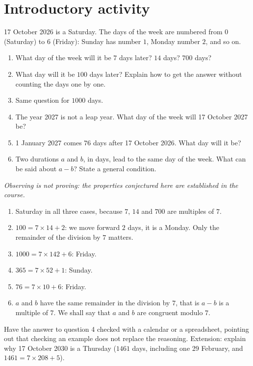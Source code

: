 \section{Introductory activity}
\begin{activity}
17 October 2026 is a Saturday. The days of the week are numbered from $0$ (Saturday) to $6$ (Friday): Sunday has number $1$, Monday number $2$, and so on.
\begin{enumerate}
\item What day of the week will it be $7$ days later? $14$ days? $700$ days?
\item What day will it be $100$ days later? Explain how to get the answer without counting the days one by one.
\item Same question for $\num{1000}$ days.
\item The year 2027 is not a leap year. What day of the week will 17 October 2027 be?
\item 1 January 2027 comes $76$ days after 17 October 2026. What day will it be?
\item Two durations $a$ and $b$, in days, lead to the same day of the week. What can be said about $a-b$? State a general condition.
\end{enumerate}
\par\emph{Observing is not proving: the properties conjectured here are established in the course.}
\end{activity}
\begin{solution}[Activity]
\begin{enumerate}
\item Saturday in all three cases, because $7$, $14$ and $700$ are multiples of $7$.
\item $100=7\times14+2$: we move forward $2$ days, it is a Monday. Only the remainder of the division by $7$ matters.
\item $\num{1000}=7\times142+6$: Friday.
\item $365=7\times52+1$: Sunday.
\item $76=7\times10+6$: Friday.
\item $a$ and $b$ have the same remainder in the division by $7$, that is $a-b$ is a multiple of $7$. We shall say that $a$ and $b$ are congruent modulo $7$.
\end{enumerate}
\end{solution}
\begin{teachernote}
Have the answer to question 4 checked with a calendar or a spreadsheet, pointing out that checking an example does not replace the reasoning. Extension: explain why 17 October 2030 is a Thursday ($\num{1461}$ days, including one 29 February, and $\num{1461}=7\times208+5$).
\end{teachernote}

